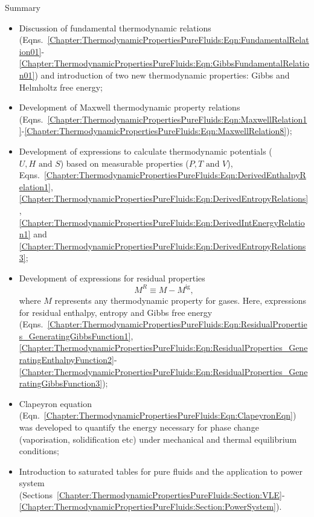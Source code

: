 \clearpage   
\begin{FinalSummaryBlock}{Summary}
    \begin{itemize}
       \item Discussion of fundamental thermodynamic relations (Eqns.~\ref{Chapter:ThermodynamicPropertiesPureFluids:Eqn:FundamentalRelation01}-\ref{Chapter:ThermodynamicPropertiesPureFluids:Eqn:GibbsFundamentalRelation01}) and introduction of two new thermodynamic properties: Gibbs and Helmholtz free energy;
       \item Development of Maxwell thermodynamic property relations (Eqns.~\ref{Chapter:ThermodynamicPropertiesPureFluids:Eqn:MaxwellRelation1}-\ref{Chapter:ThermodynamicPropertiesPureFluids:Eqn:MaxwellRelation8});
       \item Development of expressions to calculate thermodynamic potentials ($U, H\text{ and } S$) based on measurable properties ($P, T\text{ and } V$), Eqns.~\ref{Chapter:ThermodynamicPropertiesPureFluids:Eqn:DerivedEnthalpyRelation1}, \ref{Chapter:ThermodynamicPropertiesPureFluids:Eqn:DerivedEntropyRelations}, \ref{Chapter:ThermodynamicPropertiesPureFluids:Eqn:DerivedIntEnergyRelation1} and \ref{Chapter:ThermodynamicPropertiesPureFluids:Eqn:DerivedEntropyRelations3};
       \item Development of expressions for residual properties 
      \begin{displaymath}
         M^{R} \equiv M - M^{\text{ig}},
      \end{displaymath}
      where $M$ represents any thermodynamic property for gases. Here, expressions for residual enthalpy, entropy and Gibbs free energy (Eqns.~\ref{Chapter:ThermodynamicPropertiesPureFluids:Eqn:ResidualProperties_GeneratingGibbsFunction1}, \ref{Chapter:ThermodynamicPropertiesPureFluids:Eqn:ResidualProperties_GeneratingEnthalpyFunction2}-\ref{Chapter:ThermodynamicPropertiesPureFluids:Eqn:ResidualProperties_GeneratingGibbsFunction3});
      \item Clapeyron equation (Eqn.~\ref{Chapter:ThermodynamicPropertiesPureFluids:Eqn:ClapeyronEqn}) was developed to quantify the energy necessary for phase change (\eg vaporisation, solidification etc) under mechanical and thermal equilibrium conditions;
       \item Introduction to saturated tables for pure fluids and the application to power system (Sections~\ref{Chapter:ThermodynamicPropertiesPureFluids:Section:VLE}-\ref{Chapter:ThermodynamicPropertiesPureFluids:Section:PowerSystem}).
    \end{itemize}
\end{FinalSummaryBlock}



